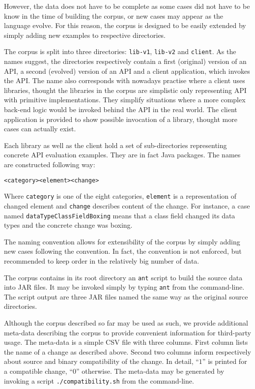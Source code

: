 \documentclass[conference]{IEEEtran}
\begin{document}
However, the data does not have to be complete as some cases did not have to be know in the time of building the corpus, or new cases may appear as the language evolve. For this reason, the corpus is designed to be easily extended by simply adding new examples to respective directories.

The corpus is split into three directories: \texttt{lib-v1}, \texttt{lib-v2} and \texttt{client}. As the names suggest, the directories respectively contain a first (original) version of an API, a second (evolved) version of an API and a client application, which invokes the API. The name also corresponds with nowadays practise where a client uses libraries, thought the libraries in the corpus are simplistic only representing API with primitive implementations. They simplify situations where a more complex back-end logic would be invoked behind the API in the real world. The client application is provided to show possible invocation of a library, thought more cases can actually exist.

Each library as well as the client hold a set of sub-directories representing concrete API evaluation examples. They are in fact Java packages. The names are constructed following way:
\begin{verbatim}
<category><element><change>
\end{verbatim} 

Where \texttt{category} is one of the eight categories, \texttt{element} is a representation of changed element and \texttt{change} describes content of the change. For instance, a case named \texttt{dataTypeClassFieldBoxing} means that a class field changed its data types and the concrete change was boxing.

The naming convention allows for extensibility of the corpus by simply adding new cases following the convention. In fact, the convention is not enforced, but recommended to keep order in the relatively big number of data.

The corpus contains in its root directory an \texttt{ant} script to build the source data into JAR files. It may be invoked simply by typing \texttt{ant} from the command-line.  The script output are three JAR files named the same way as the original source directories.

Although the corpus described so far may be used as such, we provide additional meta-data describing the corpus to provide convenient information for third-party usage. The meta-data is a simple CSV file with three columns. First column lists the name of a change as described above. Second two columns inform respectively about source and binary compatibility of the change. In detail, ``$1$'' is printed for a compatible change, ``$0$'' otherwise. The meta-data may be generated by invoking a script \texttt{./compatibility.sh} from the command-line.
\end{document}
